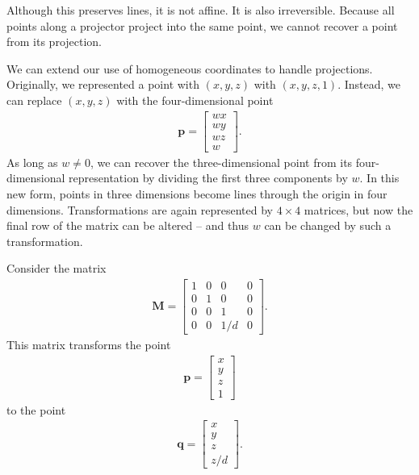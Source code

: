\documentclass[../COS3712_Notes.tex]{subfiles}
\begin{document}
      Although this  preserves lines,
      it is not affine.
      It is also irreversible.
      Because all points along a projector project into the same point,
      we cannot recover a point from its projection.

      We can extend our use of homogeneous coordinates to handle projections.
      Originally, we represented a point with $(x, y, z)$ with $(x, y, z, 1)$.
      Instead, we can replace $(x, y, z)$ with the four-dimensional point
      \begin{align*}
        \mathbf{p} = \begin{bmatrix}
          wx \\
          wy \\
          wz \\
          w
        \end{bmatrix}.
      \end{align*}
      As long as $w \neq 0$, we can recover the three-dimensional point from its four-dimensional
      representation by dividing the first three components by $w$.
      In this new form, points in three dimensions become lines through the origin
      in four dimensions.
      Transformations are again represented by $4 \times 4$ matrices,
      but now the final row of the matrix can be altered
      -- and thus $w$ can be changed by such a transformation.

      Consider the matrix
      \begin{align*}
        \mathbf{M} = \begin{bmatrix}
          1 & 0 & 0 & 0 \\
          0 & 1 & 0 & 0 \\
          0 & 0 & 1 & 0 \\
          0 & 0 & 1/d & 0
        \end{bmatrix}.
      \end{align*}
      This matrix transforms the point
      \begin{align*}
        \mathbf{p} = \begin{bmatrix}
          x \\
          y \\
          z \\
          1
        \end{bmatrix}
      \end{align*}
      to the point
      \begin{align*}
        \mathbf{q} = \begin{bmatrix}
          x \\
          y \\
          z \\
          z/d
        \end{bmatrix}.
      \end{align*}
\end{document}
